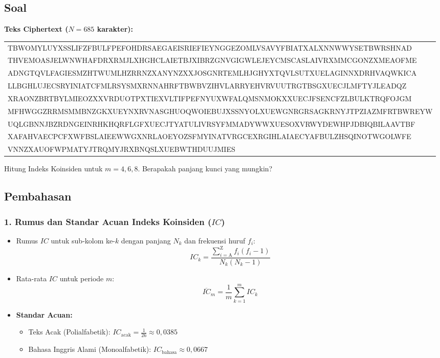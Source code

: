 \documentclass[11pt,a4paper]{article}
\begin{document}
\subsection*{Soal}
\begin{tcolorbox}[title=Soal 2]
\textbf{Teks Ciphertext ($N = 685$ karakter):}
\begin{center}
\ttfamily\footnotesize
\begin{tabular}{l}
TBWOMYLUYXSSLIFZFBULFPEFOHDRSAEGAEISRIEFIEYNGGEZOMLVSAVYFBIATXALXNNWWYSETBWRSHNAD \\
THVEMOASJELWNWHAFDRXRMJLXHGHCLAIETBJXIBRZGNVGIGWLEJEYCMSCASLAIVRXMMCGONZXMEAOFME \\
ADNGTQVLFAGIESMZHTWUMLHZRRNZXANYNZXXJOSGNRTEMLHJGHYXTQVLSUTXUELAGINNXDRHVAQWKICA \\
LLBGHLUJECSRYINIATCFMLRSYSMXRNNAHRFTBWBVZIHVLARRYEHVRVUUTRGTBSGXUECJLMFTYJLEADQZ \\
XRAONZBRTBYLMIEOZXXVRDUOTPXTIEXVLTIFPEFNYUXWFALQMSNMOKXXUECJFSENCFZLBULKTRQFOJGM \\
MFHWGGZRRMSMMBNZGKXUEYNXRVNASGHUOQWOIEBUJXSSNYOLXUEWGNRGRSAGKRNYJTPZIAZMFRTBWREYW \\
UQLGBNNJBZRDNGEINRHKHQRFLGFXUECJTYATULIVRSYFMMADYWWXUESOXVRWYDEWHPJDBIQBILAAVTBF \\
XAFAHVAECPCFXWFBSLAIEEWWGXNRLAOEYOZSFMYINATVRGCEXRGIHLAIAECYAFBULZHSQINOTWGOLWFE \\
VNNZXAUOFWPMATYJTRQMYJRXBNQSLXUEBWTHDUUJMIES
\end{tabular}
\end{center}

\vspace{0.2cm}
Hitung Indeks Koinsiden untuk $m=4,6,8$. Berapakah panjang kunci yang mungkin?
\end{tcolorbox}

\subsection*{Pembahasan}

\subsubsection*{1. Rumus dan Standar Acuan Indeks Koinsiden ($IC$)}
\begin{itemize}[leftmargin=*, noitemsep]
    \item Rumus $IC$ untuk sub-kolom ke-$k$ dengan panjang $N_k$ dan frekuensi huruf $f_i$:
    $$IC_k = \frac{\sum_{i=\text{A}}^{\text{Z}} f_i(f_i - 1)}{N_k(N_k - 1)}$$
    \item Rata-rata $IC$ untuk periode $m$:
    $$\overline{IC}_m = \frac{1}{m} \sum_{k=1}^m IC_k$$
    \item \textbf{Standar Acuan:}
    \begin{itemize}[noitemsep]
        \item Teks Acak (Polialfabetik): $IC_{\text{acak}} = \frac{1}{26} \approx 0{,}0385$
        \item Bahasa Inggris Alami (Monoalfabetik): $IC_{\text{bahasa}} \approx 0{,}0667$
    \end{itemize}
\end{itemize}
\end{document}
